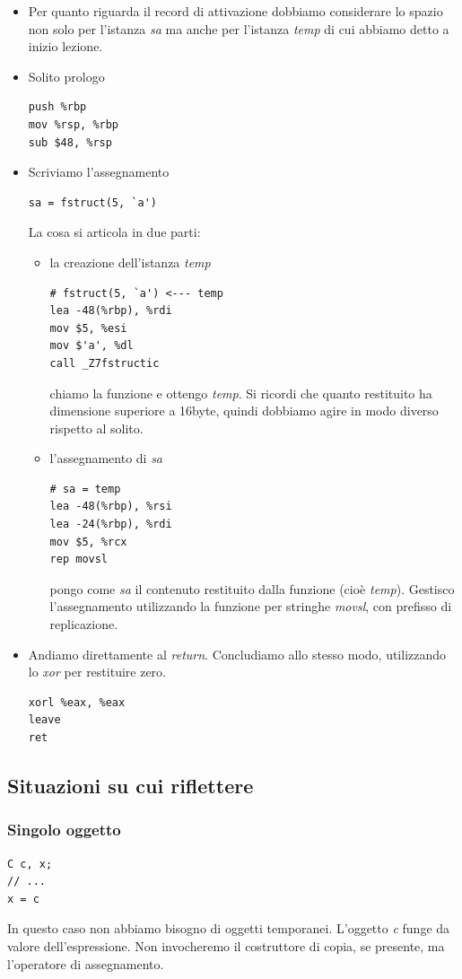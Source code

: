 \documentclass[11pt]{report}
\theoremstyle{definition}
\begin{document}
\begin{itemize}
\item Per quanto riguarda il record di attivazione dobbiamo considerare lo spazio non solo per l'istanza \emph{sa} ma anche per l'istanza \emph{temp} di cui abbiamo detto a inizio lezione.
\item Solito prologo
\begin{verbatim}
push %rbp
mov %rsp, %rbp
sub $48, %rsp
\end{verbatim}
\item Scriviamo l'assegnamento
\begin{verbatim}
sa = fstruct(5, `a')
\end{verbatim}
La cosa si articola in due parti:
\begin{itemize}
\item la creazione dell'istanza \emph{temp}
\begin{verbatim}
# fstruct(5, `a') <--- temp
lea -48(%rbp), %rdi
mov $5, %esi
mov $'a', %dl
call _Z7fstructic
\end{verbatim}
chiamo la funzione e ottengo \emph{temp}. Si ricordi che quanto restituito ha dimensione superiore a 16byte, quindi dobbiamo agire in modo diverso rispetto al solito.
\item l'assegnamento di \emph{sa}
\begin{verbatim}    
# sa = temp
lea -48(%rbp), %rsi
lea -24(%rbp), %rdi
mov $5, %rcx
rep movsl
\end{verbatim}
pongo come \emph{sa} il contenuto restituito dalla funzione (cioè \emph{temp}). Gestisco l'assegnamento utilizzando la funzione per stringhe \emph{movsl}, con prefisso di replicazione.
\end{itemize}
\item Andiamo direttamente al \emph{return}. Concludiamo allo stesso modo, utilizzando lo \emph{xor} per restituire zero.
\begin{verbatim}
xorl %eax, %eax
leave
ret
\end{verbatim}
\end{itemize}
\endgroup

\subsection{Situazioni su cui riflettere}
\subsubsection{Singolo oggetto}
\begin{verbatim}
C c, x;
// ...
x = c
\end{verbatim}
In questo caso non abbiamo bisogno di oggetti temporanei. L'oggetto \emph{c} funge da valore dell'espressione. Non invocheremo il costruttore di copia, se presente, ma l'operatore di assegnamento.
\end{document}
